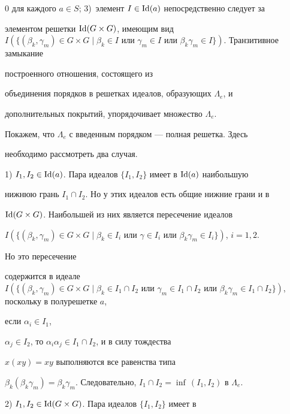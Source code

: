 0 для каждого $a\in S$; 3)~элемент $I\in \operatorname{Id}(a)$ непосредственно следует за


элементом решетки $\Id(G\times G)$, имеющим вид $I(\{(\beta_k,\gamma_m)\in


G\times G\mid \beta_k\in I\text{ или }\gamma_m\in I


\text{ или }\beta_k\gamma_m\in I\})$. Транзитивное замыкание


построенного отношения, состоящего из


объединения порядков в решетках идеалов, образующих $\Lambda_e$, и


дополнительных покрытий, упорядочивает множество $\Lambda_e$.





Покажем, что $\Lambda_e$ с введенным порядком --- полная решетка. Здесь


необходимо рассмотреть два случая.





1) $I_1,I_2\in \operatorname{Id}(a)$. Пара идеалов $\{I_1,I_2\}$ имеет в $\operatorname{Id}(a)$ наибольшую


нижнюю грань $I_1\cap I_2$. Но у этих идеалов есть общие нижние грани и в


$\operatorname{Id}(G\times G)$. Наибольшей из них является пересечение идеалов


$I(\{(\beta_k,\gamma_m)\in G\times G\mid\beta_k\in I_i\text{ или }


\gamma\in I_i\text{ или }\beta_k\gamma_m\in I_i\})$, $i=1,2$.


Но это пересечение


содержится в идеале $I(\{(\beta_k,\gamma_m)\in G\times G\mid \beta_k\in


I_1\cap I_2\text{ или }\gamma_m\in I_1\cap I_2\text{ или }


\beta_k\gamma_m\in I_1\cap I_2\})$, поскольку в полурешетке $a$,


если $\alpha_i\in I_1$,


$\alpha_j\in I_2$, то $\alpha_i\alpha_j\in I_1\cap I_2$, и в силу тождества


$x(xy)=xy$ выполняются все равенства типа


$\beta_k(\beta_k\gamma_m)=\beta_k\gamma_m$. Следовательно, $I_1\cap


I_2=\inf\,(I_1,I_2)$ в $\Lambda_e$.





2) $I_1,I_2\in \operatorname{Id}(G\times G)$. Пара идеалов $\{I_1,I_2\}$ имеет в


